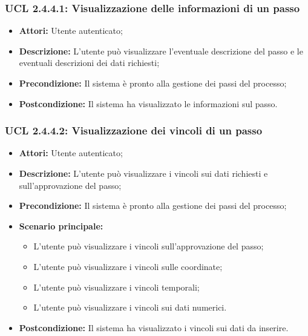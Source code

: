 \subsubsection{UCL 2.4.4.1: Visualizzazione delle informazioni di un passo}
\begin{itemize}
\item \textbf{Attori:} Utente autenticato;
\item \textbf{Descrizione:} L'utente può visualizzare l'eventuale descrizione del passo e le eventuali descrizioni dei dati richiesti;
\item \textbf{Precondizione:} Il sistema è pronto alla gestione dei passi del processo;
\item \textbf{Postcondizione:} Il sistema ha visualizzato le informazioni sul passo.
\end{itemize}

\hypertarget{L2.4.4.2}{}
\subsubsection{UCL 2.4.4.2: Visualizzazione dei vincoli di un passo}
\begin{itemize}
\item \textbf{Attori:} Utente autenticato;
\item \textbf{Descrizione:} L'utente può visualizzare i vincoli sui dati richiesti e sull'approvazione del passo;
\item \textbf{Precondizione:} Il sistema è pronto alla gestione dei passi del processo;
\item \textbf{Scenario principale:}
\begin{itemize}
\item L'utente può visualizzare i vincoli sull'approvazione del passo;
\item L'utente può visualizzare i vincoli sulle coordinate;
\item L'utente può visualizzare i vincoli temporali;
\item L'utente può visualizzare i vincoli sui dati numerici.
\end{itemize}
\item \textbf{Postcondizione:} Il sistema ha visualizzato i vincoli sui dati da inserire.
\end{itemize}


